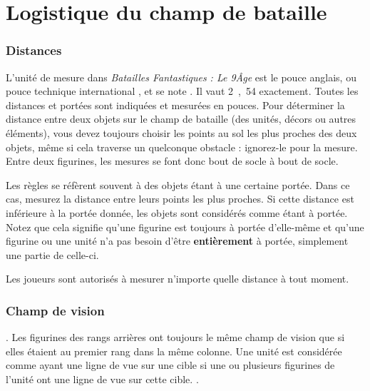 
\part{Logistique du champ de bataille}

\section{Distances}

L'unité de mesure dans \emph{Batailles Fantastiques : Le 9\ieme Âge} est le pouce anglais, ou \og pouce technique international \fg , et se note \pouce. Il vaut \unit{2,54}{\centi\meter} exactement. Toutes les distances et portées sont indiquées et mesurées en pouces. Pour déterminer la distance entre deux objets sur le champ de bataille (des unités, décors ou autres éléments), vous devez toujours choisir les points au sol les plus proches des deux objets, même si cela traverse un quelconque obstacle : ignorez-le pour la mesure. Entre deux figurines, les mesures se font donc bout de socle à bout de socle.

Les règles se réfèrent souvent à des objets étant à une certaine portée. Dans ce cas, mesurez la distance entre leurs points les plus proches. Si cette distance est inférieure à la portée donnée, les objets sont considérés comme étant à portée. Notez que cela signifie qu'une figurine est toujours à portée d'elle-même et qu'une figurine ou une unité n'a pas besoin d'être \textbf{entièrement} à portée, simplement une partie de celle-ci.
 
Les joueurs sont autorisés à mesurer n'importe quelle distance à tout moment.

\section{Champ de vision}

. Les figurines des rangs arrières ont toujours le même champ de vision que si elles étaient au premier rang dans la même colonne. Une unité est considérée comme ayant une ligne de vue sur une cible si une ou plusieurs figurines de l'unité ont une ligne de vue sur cette cible. .

